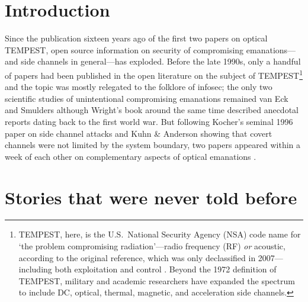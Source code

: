 \documentclass[conference]{IEEEtran}
\begin{document}
\title{}

\author{
}

\maketitle

\begin{abstract}
	
\end{abstract}

\section{Introduction}

Since the publication sixteen years ago of the first two papers on optical
TEMPEST, open source information on security of compromising emanations---and
side channels in general---has exploded. Before the late 1990s, only a
handful of papers had been published in the open literature on the subject of
TEMPEST\footnote{TEMPEST, here, is the U.S.\ National Security Agency (NSA)
code name for `the problem compromising radiation'---radio frequency (RF)
\emph{or} acoustic, according to the original reference, which was only
declassified in 2007---including both exploitation and control
\cite{NSATempest2007}. Beyond the 1972 definition of TEMPEST, military and
academic researchers have expanded the spectrum to include DC, optical,
thermal, magnetic, and acceleration side channels.} and the topic was mostly
relegated to the folklore of infosec; the only two scientific studies of
unintentional compromising emanations remained van Eck \cite{vanEck1985} and
Smulders \cite{Smulders1990} although Wright's book around the same time
\cite{Wright1987} described anecdotal reports dating back to the first world
war. But following Kocher's seminal 1996 paper on side channel attacks
\cite{Kocher1996} and Kuhn \& Anderson \cite{Kuhn1998a} showing that covert
channels were not limited by the system boundary, two papers appeared within
a week of each other on complementary aspects of optical emanations
\cite{Kuhn2002,Loughry2002a}.

\section{Stories that were never told before}
\end{document}
